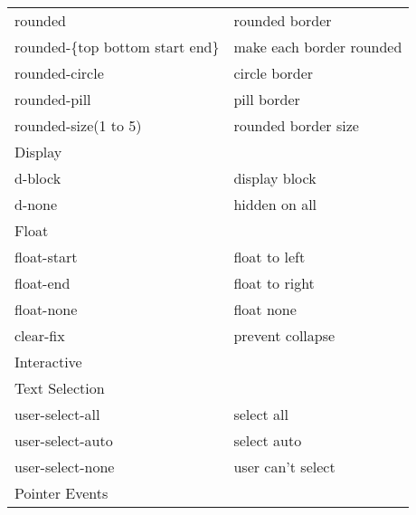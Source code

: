 \documentclass{article}
\begin{document}
\begin{longtable}{ll}
			rounded                                     & rounded border                              \\
			rounded-\{top bottom start end\}            & make each border rounded                    \\
			rounded-circle                              & circle border                               \\
			rounded-pill                                & pill border                                 \\
			rounded-size(1 to 5)                        & rounded border size                         \\ \hline
			Display                                     &                                             \\ \hline
			d-block                                     & display block                               \\
			d-none                                      & hidden on all                               \\ \hline
			Float                                       &                                             \\ \hline
			float-start                                 & float to left                               \\
			float-end                                   & float to right                              \\
			float-none                                  & float none                                  \\
			clear-fix                                   & prevent collapse                            \\ \hline
			Interactive                                 &                                             \\ \hline
			Text Selection                              &                                             \\ \hline
			user-select-all                             & select all                                  \\
			user-select-auto                            & select auto                                 \\
			user-select-none                            & user can't select                           \\ \hline
			Pointer Events                              &                                             \\ \hline

\end{longtable}
\end{document}
